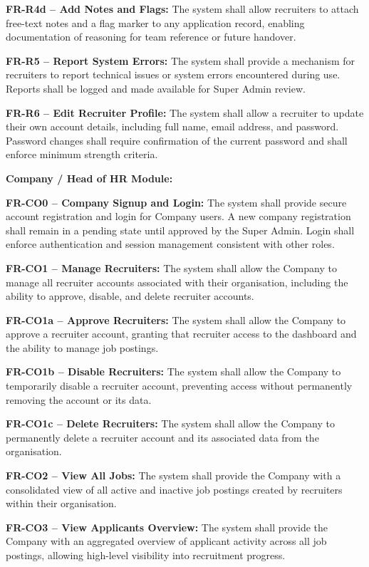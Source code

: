 \begin{outline}
    \3 \textbf{FR-R4d -- Add Notes and Flags:}
    The system shall allow recruiters to attach free-text notes and a flag marker to any
    application record, enabling documentation of reasoning for team reference or future
    handover.

  \2 \textbf{FR-R5 -- Report System Errors:}
  The system shall provide a mechanism for recruiters to report technical issues or system
  errors encountered during use. Reports shall be logged and made available for Super Admin
  review.

  \2 \textbf{FR-R6 -- Edit Recruiter Profile:}
  The system shall allow a recruiter to update their own account details, including full
  name, email address, and password. Password changes shall require confirmation of the
  current password and shall enforce minimum strength criteria.

  \1 \textbf{Company / Head of HR Module:}

  \2 \textbf{FR-CO0 -- Company Signup and Login:}
  The system shall provide secure account registration and login for Company users. A new
  company registration shall remain in a pending state until approved by the Super Admin.
  Login shall enforce authentication and session management consistent with other roles.

  \2 \textbf{FR-CO1 -- Manage Recruiters:}
  The system shall allow the Company to manage all recruiter accounts associated with their
  organisation, including the ability to approve, disable, and delete recruiter accounts.

    \3 \textbf{FR-CO1a -- Approve Recruiters:}
    The system shall allow the Company to approve a recruiter account, granting that recruiter
    access to the dashboard and the ability to manage job postings.

    \3 \textbf{FR-CO1b -- Disable Recruiters:}
    The system shall allow the Company to temporarily disable a recruiter account, preventing
    access without permanently removing the account or its data.

    \3 \textbf{FR-CO1c -- Delete Recruiters:}
    The system shall allow the Company to permanently delete a recruiter account and its
    associated data from the organisation.

  \2 \textbf{FR-CO2 -- View All Jobs:}
  The system shall provide the Company with a consolidated view of all active and inactive
  job postings created by recruiters within their organisation.

  \2 \textbf{FR-CO3 -- View Applicants Overview:}
  The system shall provide the Company with an aggregated overview of applicant activity
  across all job postings, allowing high-level visibility into recruitment progress.


\end{outline}
